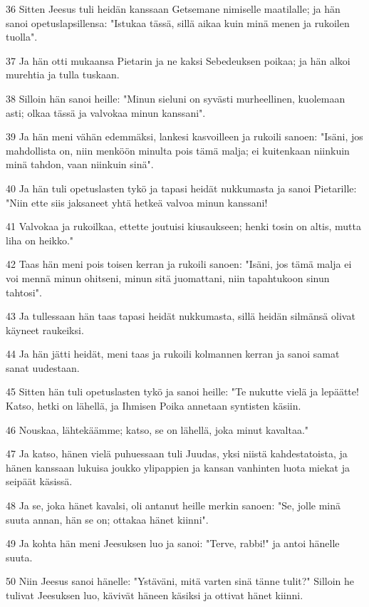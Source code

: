 \par 36 Sitten Jeesus tuli heidän kanssaan Getsemane nimiselle maatilalle; ja hän sanoi opetuslapsillensa: "Istukaa tässä, sillä aikaa kuin minä menen ja rukoilen tuolla".
\par 37 Ja hän otti mukaansa Pietarin ja ne kaksi Sebedeuksen poikaa; ja hän alkoi murehtia ja tulla tuskaan.
\par 38 Silloin hän sanoi heille: "Minun sieluni on syvästi murheellinen, kuolemaan asti; olkaa tässä ja valvokaa minun kanssani".
\par 39 Ja hän meni vähän edemmäksi, lankesi kasvoilleen ja rukoili sanoen: "Isäni, jos mahdollista on, niin menköön minulta pois tämä malja; ei kuitenkaan niinkuin minä tahdon, vaan niinkuin sinä".
\par 40 Ja hän tuli opetuslasten tykö ja tapasi heidät nukkumasta ja sanoi Pietarille: "Niin ette siis jaksaneet yhtä hetkeä valvoa minun kanssani!
\par 41 Valvokaa ja rukoilkaa, ettette joutuisi kiusaukseen; henki tosin on altis, mutta liha on heikko."
\par 42 Taas hän meni pois toisen kerran ja rukoili sanoen: "Isäni, jos tämä malja ei voi mennä minun ohitseni, minun sitä juomattani, niin tapahtukoon sinun tahtosi".
\par 43 Ja tullessaan hän taas tapasi heidät nukkumasta, sillä heidän silmänsä olivat käyneet raukeiksi.
\par 44 Ja hän jätti heidät, meni taas ja rukoili kolmannen kerran ja sanoi samat sanat uudestaan.
\par 45 Sitten hän tuli opetuslasten tykö ja sanoi heille: "Te nukutte vielä ja lepäätte! Katso, hetki on lähellä, ja Ihmisen Poika annetaan syntisten käsiin.
\par 46 Nouskaa, lähtekäämme; katso, se on lähellä, joka minut kavaltaa."
\par 47 Ja katso, hänen vielä puhuessaan tuli Juudas, yksi niistä kahdestatoista, ja hänen kanssaan lukuisa joukko ylipappien ja kansan vanhinten luota miekat ja seipäät käsissä.
\par 48 Ja se, joka hänet kavalsi, oli antanut heille merkin sanoen: "Se, jolle minä suuta annan, hän se on; ottakaa hänet kiinni".
\par 49 Ja kohta hän meni Jeesuksen luo ja sanoi: "Terve, rabbi!" ja antoi hänelle suuta.
\par 50 Niin Jeesus sanoi hänelle: "Ystäväni, mitä varten sinä tänne tulit?" Silloin he tulivat Jeesuksen luo, kävivät häneen käsiksi ja ottivat hänet kiinni.
